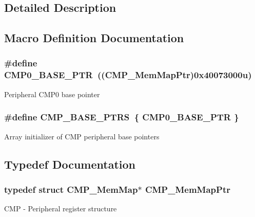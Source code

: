 \subsection{Detailed Description}


\subsection{Macro Definition Documentation}
\hypertarget{group___c_m_p___peripheral_ga5a7a6b1d0743a05435ba5cb2dc2b3431}{}
\subsubsection[{C\+M\+P0\+\_\+\+B\+A\+S\+E\+\_\+\+P\+T\+R}]{\setlength{\rightskip}{0pt plus 5cm}\#define C\+M\+P0\+\_\+\+B\+A\+S\+E\+\_\+\+P\+T\+R~(({\bf C\+M\+P\+\_\+\+Mem\+Map\+Ptr})0x40073000u)}\label{group___c_m_p___peripheral_ga5a7a6b1d0743a05435ba5cb2dc2b3431}
Peripheral C\+M\+P0 base pointer \hypertarget{group___c_m_p___peripheral_gacc69654296499d45b2060956a3c8e97f}{}
\subsubsection[{C\+M\+P\+\_\+\+B\+A\+S\+E\+\_\+\+P\+T\+R\+S}]{\setlength{\rightskip}{0pt plus 5cm}\#define C\+M\+P\+\_\+\+B\+A\+S\+E\+\_\+\+P\+T\+R\+S~\{ {\bf C\+M\+P0\+\_\+\+B\+A\+S\+E\+\_\+\+P\+T\+R} \}}\label{group___c_m_p___peripheral_gacc69654296499d45b2060956a3c8e97f}
Array initializer of C\+M\+P peripheral base pointers 

\subsection{Typedef Documentation}
\hypertarget{group___c_m_p___peripheral_ga6f5d370df3839e41b771c2d0b89cbb83}{}
\subsubsection[{C\+M\+P\+\_\+\+Mem\+Map\+Ptr}]{\setlength{\rightskip}{0pt plus 5cm}typedef struct {\bf C\+M\+P\+\_\+\+Mem\+Map}$\ast$ {\bf C\+M\+P\+\_\+\+Mem\+Map\+Ptr}}\label{group___c_m_p___peripheral_ga6f5d370df3839e41b771c2d0b89cbb83}
C\+M\+P -\/ Peripheral register structure 